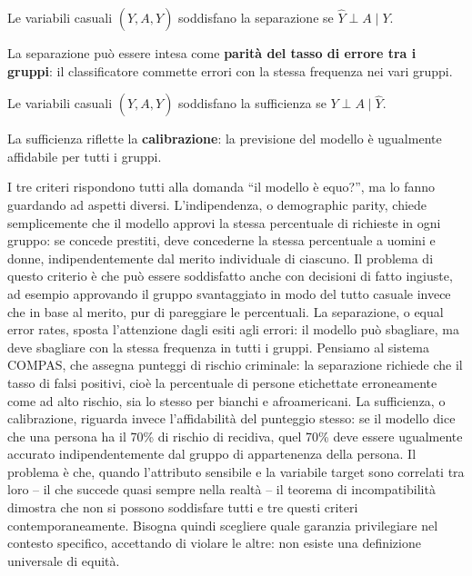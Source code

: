 \documentclass[a4paper,11pt]{article}
\begin{document}
\begin{definizione}
Le variabili casuali $(\hat{Y}, A, Y)$ soddisfano la separazione se $\hat{Y} \perp A \mid Y$.

La separazione pu\`{o} essere intesa come \textbf{parit\`{a} del tasso di errore tra i gruppi}: il classificatore commette errori con la stessa frequenza nei vari gruppi.
\end{definizione}

\begin{definizione}
Le variabili casuali $(\hat{Y}, A, Y)$ soddisfano la sufficienza se $Y \perp A \mid \hat{Y}$.

La sufficienza riflette la \textbf{calibrazione}: la previsione del modello \`{e} ugualmente affidabile per tutti i gruppi.
\end{definizione}

\begin{nota}
I tre criteri rispondono tutti alla domanda ``il modello è equo?'', ma lo fanno guardando ad aspetti diversi. L'indipendenza, o demographic parity, chiede semplicemente che il modello approvi la stessa percentuale di richieste in ogni gruppo: se concede prestiti, deve concederne la stessa percentuale a uomini e donne, indipendentemente dal merito individuale di ciascuno. Il problema di questo criterio è che può essere soddisfatto anche con decisioni di fatto ingiuste, ad esempio approvando il gruppo svantaggiato in modo del tutto casuale invece che in base al merito, pur di pareggiare le percentuali. La separazione, o equal error rates, sposta l'attenzione dagli esiti agli errori: il modello può sbagliare, ma deve sbagliare con la stessa frequenza in tutti i gruppi. Pensiamo al sistema COMPAS, che assegna punteggi di rischio criminale: la separazione richiede che il tasso di falsi positivi, cioè la percentuale di persone etichettate erroneamente come ad alto rischio, sia lo stesso per bianchi e afroamericani. La sufficienza, o calibrazione, riguarda invece l'affidabilità del punteggio stesso: se il modello dice che una persona ha il 70\% di rischio di recidiva, quel 70\% deve essere ugualmente accurato indipendentemente dal gruppo di appartenenza della persona. Il problema è che, quando l'attributo sensibile e la variabile target sono correlati tra loro -- il che succede quasi sempre nella realtà -- il teorema di incompatibilità dimostra che non si possono soddisfare tutti e tre questi criteri contemporaneamente. Bisogna quindi scegliere quale garanzia privilegiare nel contesto specifico, accettando di violare le altre: non esiste una definizione universale di equità.
\end{nota}
\end{document}
